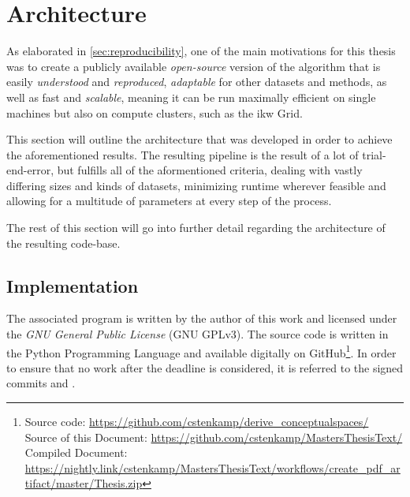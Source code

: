 


\section{Architecture}
\label{sec:architecture}

As elaborated in \autoref{sec:reproducibility}, one of the main motivations for this thesis was to create a publicly available \textit{open-source} version of the algorithm that is easily \textit{understood} and \textit{reproduced}, \textit{adaptable} for other datasets and methods, as well as fast and \textit{scalable}, meaning it can be run maximally efficient on single machines but also on compute clusters, such as the \acrshort{ikw} Grid.


This section will outline the architecture that was developed in order to achieve the aforementioned results. The resulting pipeline is the result of a lot of trial-end-error, but fulfills all of the aformentioned criteria, dealing with vastly differing sizes and kinds of datasets, minimizing runtime wherever feasible and allowing for a multitude of parameters at every step of the process. %

The rest of this section will go into further detail regarding the architecture of the resulting code-base. 

\subsection{Implementation}

The associated program is written by the author of this work and licensed under the \emph{GNU General Public License} (GNU GPLv3). The source code is written in the Python Programming Language and available digitally on GitHub\footnote{Source code: \url{https://github.com/cstenkamp/derive_conceptualspaces/}\\Source of this Document: \url{https://github.com/cstenkamp/MastersThesisText/}\\Compiled Document: \url{https://nightly.link/cstenkamp/MastersThesisText/workflows/create_pdf_artifact/master/Thesis.zip}}. In order to ensure that no work after the deadline is considered, it is referred to the signed commits  and . 

